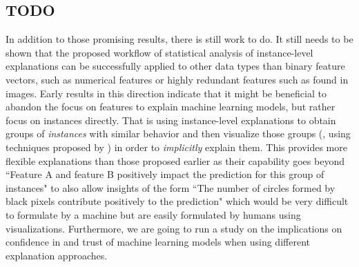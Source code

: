 \subsection{TODO}
In addition to those promising results, there is still work to do.
It still needs to be shown that the proposed workflow of statistical analysis of instance-level explanations can be successfully applied to other data types than binary feature vectors, such as numerical features or highly redundant features such as found in images.
Early results in this direction indicate that it might be beneficial to abandon the focus on features to explain machine learning models, but rather focus on instances directly.
That is using instance-level explanations to obtain groups of \emph{instances} with similar behavior and then visualize those groups (\eg, using techniques proposed by \cite{seekaview}) in order to \emph{implicitly} explain them.
This provides more flexible explanations than those proposed earlier as their capability goes beyond ``Feature A and feature B positively impact the prediction for this group of instances" to also allow insights of the form ``The number of circles formed by black pixels contribute positively to the prediction" which would be very difficult to formulate by a machine but are easily formulated by humans using visualizations.
Furthermore, we are going to run a study on the implications on confidence in and trust of machine learning models when using different explanation approaches.
